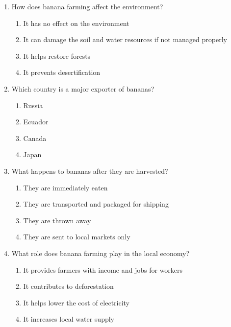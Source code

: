 \documentclass[12pt]{article}
\begin{document}
\begin{enumerate}
    \vspace{0.5cm}

    \item How does banana farming affect the environment?

    \begin{enumerate}[label=\Alph*.]
        \item It has no effect on the environment
        \item It can damage the soil and water resources if not managed properly
        \item It helps restore forests
        \item It prevents desertification
    \end{enumerate}
    
    \vspace{0.5cm}

    \item Which country is a major exporter of bananas?

    \begin{enumerate}[label=\Alph*.]
        \item Russia
        \item Ecuador
        \item Canada
        \item Japan
    \end{enumerate}
    
    \vspace{0.5cm}

    \item What happens to bananas after they are harvested?

    \begin{enumerate}[label=\Alph*.]
        \item They are immediately eaten
        \item They are transported and packaged for shipping
        \item They are thrown away
        \item They are sent to local markets only
    \end{enumerate}
    
    \vspace{0.5cm}

    \item What role does banana farming play in the local economy?

    \begin{enumerate}[label=\Alph*.]
        \item It provides farmers with income and jobs for workers
        \item It contributes to deforestation
        \item It helps lower the cost of electricity
        \item It increases local water supply
    \end{enumerate}
    

\end{enumerate}
\end{document}
